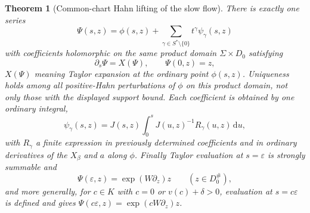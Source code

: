 \documentclass[11pt,letterpaper]{article}
\newtheorem{theorem}{Theorem}[section]
\theoremstyle{definition}
\theoremstyle{remark}
\newcommand{\eps}{\varepsilon}
\newcommand{\dd}{\,\mathrm d}
\numberwithin{equation}{section}
\begin{document}
\begin{theorem}[Common-chart Hahn lifting of the slow flow]
\label{dyn:thm:slowtime}
There is \emph{exactly one} series
\begin{equation}\label{dyn:eq:slow-solution}
 \Psi(s,z)=\phi(s,z)+\sum_{\gamma\in S^{*}\setminus\{0\}}
 t^{\gamma}\psi_\gamma(s,z)
\end{equation}
with coefficients holomorphic on the \emph{same} product domain
$\Sigma\times D_0$ satisfying
\begin{equation}\label{dyn:eq:slow-equation}
 \partial_s\Psi=X(\Psi),\qquad \Psi(0,z)=z,
\end{equation}
$X(\Psi)$ meaning Taylor expansion at the ordinary point $\phi(s,z)$.
Uniqueness holds among \emph{all} positive-Hahn perturbations of $\phi$ on
this product domain, not only those with the displayed support bound. Each
coefficient is obtained by one ordinary integral,
\begin{equation}\label{dyn:eq:variation-formula}
 \psi_\gamma(s,z)=J(s,z)\int_0^{s}J(u,z)^{-1}R_\gamma(u,z)\dd u ,
\end{equation}
with $R_\gamma$ a finite expression in previously determined coefficients
and in ordinary derivatives of the $X_\beta$ and $a$ along $\phi$.
Finally Taylor evaluation at $s=\eps$ is strongly summable and
\begin{equation}\label{dyn:eq:slow-epsilon}
 \Psi(\eps,z)=\exp(W\partial_z)z\qquad(z\in D_0^{\#}),
\end{equation}
and more generally, for $c\in K$ with $c=0$ or $v(c)+\delta>0$, evaluation
at $s=c\eps$ is defined and gives $\Psi(c\eps,z)=\exp(cW\partial_z)z$.
\end{theorem}
\end{document}

